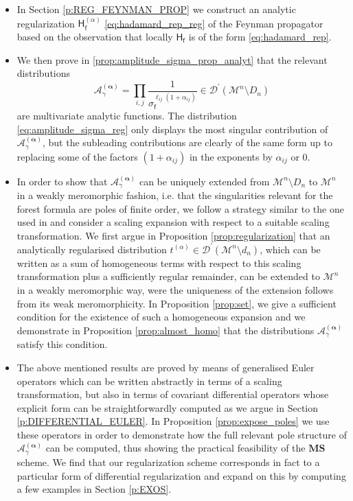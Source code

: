 \documentclass[12pt]{book}
\newcommand{\MS}{\textbf{MS}}
\newcommand{\Acal}{\mathcal{A}}
\newcommand{\Dcal}{\mathcal{D}}
\newcommand{\Mcal}{\mathcal{M}}
\newcommand{\Hsf}{\mathsf{H}}
\newcommand{\fsf}{\mathsf{f}}
\theoremstyle{break}
\begin{document}
\begin{itemize}


\item In Section \eqref{p:REG_FEYNMAN_PROP} we construct an analytic regularization $\Hsf^{(\alpha)}_\fsf$ \ref{eq:hadamard_rep_reg} of the Feynman propagator based on the observation that locally $\Hsf_\fsf$ is of the form \eqref{eq:hadamard_rep}. 


\item We then prove in \ref{prop:amplitude_sigma_prop_analyt} that the relevant distributions 
%
\begin{equation}
\Acal_\gamma^{(\boldsymbol{\alpha})} = \prod_{i,j} \frac{1}{\sigma_\fsf^{\ell_{ij}(1+\alpha_{ij})}} \in \Dcal^\prime(\Mcal^n\setminus D_n)
\label{eq:amplitude_sigma_reg}
\end{equation}
%
are multivariate analytic functions. The distribution \eqref{eq:amplitude_sigma_reg} only displays the most singular contribution of $\Acal_\gamma^{(\boldsymbol{\alpha})}$, but the subleading contributions are clearly of the same form up to replacing some of the factors $(1+\alpha_{ij})$ in the exponents by $\alpha_{ij}$ or $0$.


\item In order to show that $\Acal_\gamma^{(\boldsymbol{\alpha})}$ can be uniquely extended from $\Mcal^n\setminus D_n$ to $\Mcal^n$ in a weakly meromorphic fashion, i.e. that the singularities relevant for the forest formula are poles of finite order, we follow a strategy similar to the one used in \cite{hollands_local_2001} and consider a scaling expansion with respect to a suitable scaling transformation. We first argue in Proposition \ref{prop:regularization} that an analytically regularised distribution $t^{(\alpha)}\in\Dcal^\prime(\Mcal^n\setminus d_n)$, which can be written as a sum of homogeneous terms with respect to this scaling transformation plus a sufficiently regular remainder, can be extended to $\Mcal^n$ in a weakly meromorphic way, were the uniqueness of the extension follows from its weak meromorphicity. In Proposition \ref{prop:set}, we give a sufficient condition for the existence of such a homogeneous expansion and we demonstrate in Proposition \ref{prop:almost_homo} that the distributions $\Acal_\gamma^{(\boldsymbol{\alpha})}$ satisfy this condition.


\item The above mentioned results are proved by means of generalised Euler operators which can be written abstractly in terms of a scaling transformation, but also in terms of covariant differential operators whose explicit form can be straightforwardly computed as we argue in Section \ref{p:DIFFERENTIAL_EULER}. In Proposition \ref{prop:expose_poles} we use these operators in order to demonstrate how the full relevant pole structure of $\Acal_\gamma^{(\boldsymbol{\alpha})}$ can be computed, thus showing the practical feasibility of the $\MS$ scheme. We find that our regularization scheme corresponds in fact to a particular form of differential regularization and expand on this by computing a few examples in Section \ref{p:EXOS}.



\end{itemize}
\end{document}
